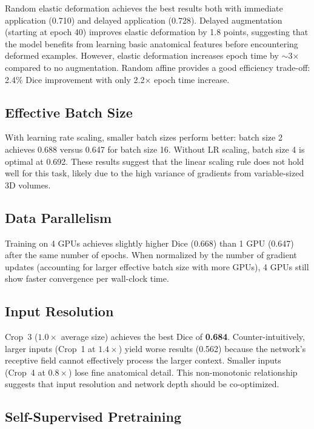 \documentclass[10pt,twocolumn]{article}
\begin{document}
Random elastic deformation achieves the best results both with immediate application (0.710) and delayed application (0.728). Delayed augmentation (starting at epoch 40) improves elastic deformation by 1.8 points, suggesting that the model benefits from learning basic anatomical features before encountering deformed examples. However, elastic deformation increases epoch time by $\sim$3$\times$ compared to no augmentation. Random affine provides a good efficiency trade-off: 2.4\% Dice improvement with only 2.2$\times$ epoch time increase.

\subsection{Effective Batch Size}

With learning rate scaling, smaller batch sizes perform better: batch size 2 achieves 0.688 versus 0.647 for batch size 16. Without LR scaling, batch size 4 is optimal at 0.692. These results suggest that the linear scaling rule does not hold well for this task, likely due to the high variance of gradients from variable-sized 3D volumes.

\subsection{Data Parallelism}

Training on 4 GPUs achieves slightly higher Dice (0.668) than 1 GPU (0.647) after the same number of epochs. When normalized by the number of gradient updates (accounting for larger effective batch size with more GPUs), 4 GPUs still show faster convergence per wall-clock time.

\subsection{Input Resolution}

Crop~3 ($1.0\times$ average size) achieves the best Dice of \textbf{0.684}. Counter-intuitively, larger inputs (Crop~1 at $1.4\times$) yield worse results (0.562) because the network's receptive field cannot effectively process the larger context. Smaller inputs (Crop~4 at $0.8\times$) lose fine anatomical detail. This non-monotonic relationship suggests that input resolution and network depth should be co-optimized.

\subsection{Self-Supervised Pretraining}
\end{document}

